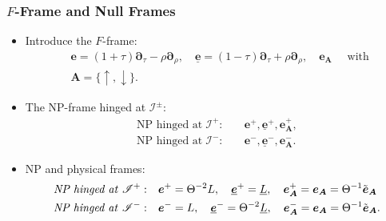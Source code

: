 \documentclass{beamer}
\theoremstyle{remark}
\theoremstyle{plain}
\theoremstyle{plain}
\begin{document}
\begin{frame}
  \frametitle{$F$-Frame and Null Frames}
  \begin{itemize}
    \item Introduce the $F$-frame:
    \begin{align}
      & \boldsymbol{e}=(1+\tau) \boldsymbol{\partial}_\tau-\rho \boldsymbol{\partial}_\rho, \quad \underline{\boldsymbol{e}}=(1-\tau) \boldsymbol{\partial}_\tau+\rho \boldsymbol{\partial}_\rho, \quad \boldsymbol{e}_{\boldsymbol{A}} \quad \text { with } \nonumber \\ 
      & \boldsymbol{A}=\{\uparrow, \downarrow\}. \nonumber 
    \end{align}
    \item The NP-frame hinged at $\mathscr{I}^{\pm}$:
    \begin{align*}
      \text{NP hinged at} \; \mathscr{I}^{+}: & \quad \boldsymbol{e}^{+}, \underline{\boldsymbol{e}}^{+}, \boldsymbol{e}_{\boldsymbol{A}}^{+}, \\
      \text{NP hinged at} \; \mathscr{I}^{-}: & \quad \boldsymbol{e}^{-}, \underline{\boldsymbol{e}}^{-}, \boldsymbol{e}_{\boldsymbol{A}}^{-}.
    \end{align*}
    \item NP and physical frames:
    \begin{align*}
      \text{\emph{NP hinged at} $\mathscr{I}^{+}$}:& \quad\boldsymbol{e}^{+} = \Theta^{-2} L, \quad \underline{\boldsymbol{e}}^{+}= \underline{L},\quad \boldsymbol{e}_{\boldsymbol{A}}^{+}= \boldsymbol{e}_{\boldsymbol{A}}= \Theta^{-1}\tilde{\boldsymbol{e}}_{\boldsymbol{A}}\\ \text{\emph{NP hinged at} $\mathscr{I}^{-}$}:& \quad\boldsymbol{e}^{-} =
       L,\quad \underline{\boldsymbol{e}}^{-}=  \Theta^{-2} \underline{L},\quad \boldsymbol{e}_{\boldsymbol{A}}^{-}= \boldsymbol{e}_{\boldsymbol{A}} = \Theta^{-1}\tilde{\boldsymbol{e}}_{\boldsymbol{A}}.
    \end{align*}
  \end{itemize}
\end{frame}

\end{document}
